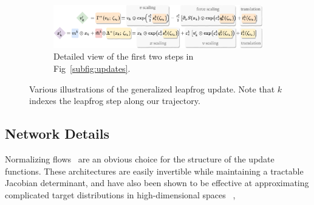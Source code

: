 \documentclass[a4paper,11pt]{article}
\begin{document}
\begin{figure}
    \begin{subfigure}[b]{\textwidth}
        \includegraphics[width=\textwidth]{assets/network_functions.pdf}
        \caption{\label{subfig:network_fns}Detailed view of the first two steps
        in Fig~\ref{subfig:updates}.}
    \end{subfigure}
    \caption{\label{fig:networks}Various illustrations of the generalized
        leapfrog update. Note that \(k\) indexes the leapfrog step along our
    trajectory.}
\end{figure}
%
%
\subsection{\label{subsec:networks}Network Details}
%
Normalizing flows~\cite{dinhDensityEstimationUsing2016b} are an obvious choice
for the structure of the update functions.
%
These architectures are easily invertible while maintaining a tractable
Jacobian determinant, and have also been shown to be effective at approximating
complicated target distributions in high-dimensional spaces ~\cite{%
    foremanDeepLearningHamiltonian2021a,
    dinhDensityEstimationUsing2016b,
    albergoFlowbasedGenerativeModels2019b,%
    boydaSamplingUsingSU2020a,%
    kanwarEquivariantFlowbasedSampling2020a,%
    wehenkelYouSayNormalizing2020a,%
    levyGeneralizingHamiltonianMonte2018b,%
    neklyudovOrbitalMCMC2020a,%
    neklyudovInvolutiveMcmcUnifying2020a%
},
\end{document}
